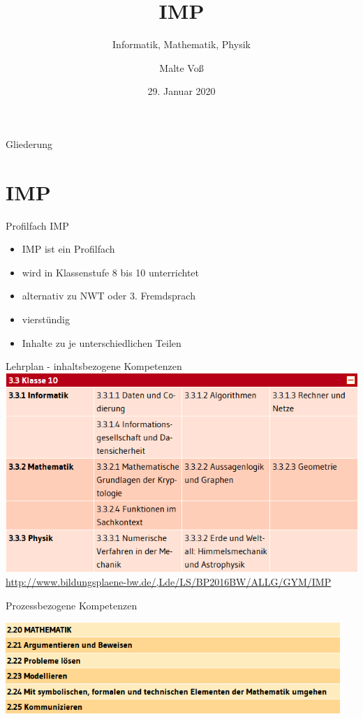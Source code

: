 \documentclass[18pt]{beamer}
\title[IMP]{IMP}
\subtitle{Informatik, Mathematik, Physik}
\author{Malte Vo\ss}
\institute{Abteilung für Didaktik der Mathematik}
\date{29. Januar 2020}
\begin{document}

\begin{frame}
\titlepage
\end{frame}

\begin{frame}{Gliederung}
\tableofcontents
\end{frame}

\section{IMP}
    \begin{frame}{Profilfach IMP}
        \begin{itemize}[<+->]
            \item IMP ist ein Profilfach
            \item wird in Klassenstufe 8 bis 10 unterrichtet
            \item alternativ zu NWT oder 3. Fremdsprach
            \item vierstündig
            \item Inhalte zu je unterschiedlichen Teilen
        \end{itemize}
    \end{frame}

    \begin{frame}{Lehrplan - inhaltsbezogene Kompetenzen}
        \includegraphics[keepaspectratio, width=\textwidth]{figures/IMP_10}
        \cite{bildungsp}
        \tiny\url{http://www.bildungsplaene-bw.de/,Lde/LS/BP2016BW/ALLG/GYM/IMP}
    \end{frame}

    \begin{frame}{Prozessbezogene Kompetenzen}
    
        \includegraphics[keepaspectratio, width=0.95\textwidth]{figures/IMP_Prozess.png}
        \cite{bildungsp}

    \end{frame}
        
\end{document}
